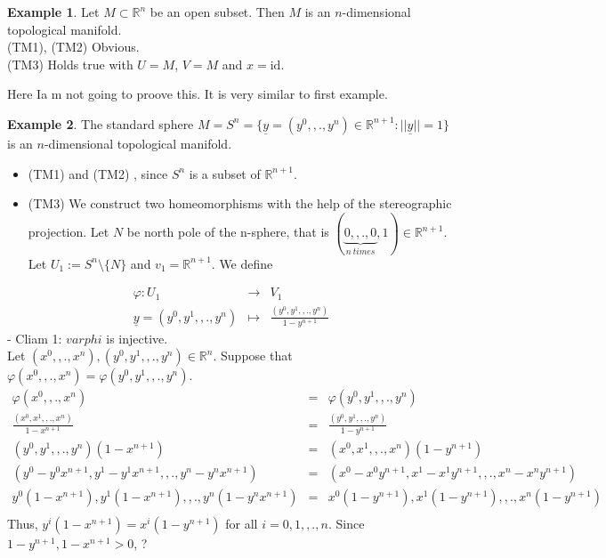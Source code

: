 \documentclass[
]{book}
\providecommand{\tightlist}{%
  \setlength{\itemsep}{0pt}\setlength{\parskip}{0pt}}
\theoremstyle{definition}
\theoremstyle{definition}
\newtheorem{example}{Example}[chapter]
\theoremstyle{definition}
\theoremstyle{definition}
\theoremstyle{remark}
\begin{document}
\begin{example}
\protect\hypertarget{exm:unnamed-chunk-9}{}\label{exm:unnamed-chunk-9}Let \(M \subset \mathbb{R}^n\) be an open subset. Then \(M\) is an \(n\)-dimensional topological manifold.\\
(TM1), (TM2) Obvious.\\
(TM3) Holds true with \(U = M\), \(V = M\) and \(x = \text{id}\).

Here Ia m not going to proove this. It is very similar to first example.
\end{example}

\begin{example}
\protect\hypertarget{exm:unnamed-chunk-10}{}\label{exm:unnamed-chunk-10}The standard sphere \(M = S^n = \{ \underline{y}=(y^0,,.,y^{n}) \in \mathbb{R}^{n+1} : ||\underline{y}|| = 1 \}\) is an \(n\)-dimensional topological manifold.

\begin{itemize}
\tightlist
\item
  (TM1) and (TM2) , since \(S^n\) is a subset of \(\mathbb{R}^{n+1}\).
\item
  (TM3) We construct two homeomorphisms with the help of the stereographic projection. Let \(N\) be north pole of the n-sphere, that is \((\underbrace{0,,.,0}_{n~times},1)\in \mathbb{R}^{n+1}\). Let \(U_1:=S^n\setminus \{N\}\) and \(v_1=\mathbb{R}^{n+1}\). We define
\end{itemize}

\begin{eqnarray}
\varphi:U_1&\to & V_1\\
\underline{y} =(y^0,y^1,,.,y^n) & \mapsto & \frac{(y^0,y^1,,.,y^n)}{1-y^{n+1}}
\end{eqnarray}
- Cliam 1: \(varphi\) is injective.\\
Let \((x^0,,.,x^{n}),(y^0,y^1,,.,y^n)\in \mathbb{R}^n\). Suppose that \(\varphi(x^0,,.,x^{n})=\varphi(y^0,y^1,,.,y^n)\).
\begin{eqnarray}
\varphi(x^0,,.,x^{n})&=&\varphi(y^0,y^1,,.,y^n)\\
\frac{(x^0,x^1,,.,x^n)}{1-x^{n+1}}&=&\frac{(y^0,y^1,,.,y^n)}{1-y^{n+1}}\\
(y^0, y^1, ,., y^n)(1-x^{n+1}) &=& (x^0, x^1, ,., x^n)(1-y^{n+1})\\
(y^0 - y^0x^{n+1}, y^1 - y^1x^{n+1}, ,., y^n - y^nx^{n+1}) &=& (x^0 - x^0y^{n+1}, x^1 - x^1y^{n+1}, ,., x^n - x^ny^{n+1})\\
y^0(1 - x^{n+1}), y^1(1 - x^{n+1}), ,., y^n (1- y^nx^{n+1}) &=&  x^0(1-y^{n+1}), x^1(1 - y^{n+1}), ,., x^n (1- y^{n+1})\\
\end{eqnarray}
Thus, \(y^i(1 - x^{n+1}) = x^i(1 -y^{n+1})\) for all \(i = 0, 1, ,., n\).
Since \(1 - y^{n+1}, 1 - x^{n+1} > 0\),
?


\end{example}
\end{document}
